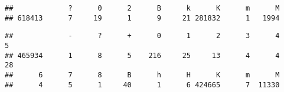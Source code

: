 \documentclass[]{article}
\newenvironment{Shaded}{\begin{snugshade}}{\end{snugshade}}
\newcommand{\KeywordTok}[1]{\textcolor[rgb]{0.13,0.29,0.53}{\textbf{#1}}}
\newcommand{\NormalTok}[1]{#1}
\newcommand{\OperatorTok}[1]{\textcolor[rgb]{0.81,0.36,0.00}{\textbf{#1}}}
\begin{document}
\begin{verbatim}
##             ?      0      2      B      k      K      m      M 
## 618413      7     19      1      9     21 281832      1   1994
\end{verbatim}

\begin{Shaded}
\end{Shaded}

\begin{verbatim}
##             -      ?      +      0      1      2      3      4      5 
## 465934      1      8      5    216     25     13      4      4     28 
##      6      7      8      B      h      H      K      m      M 
##      4      5      1     40      1      6 424665      7  11330
\end{verbatim}
\end{document}

